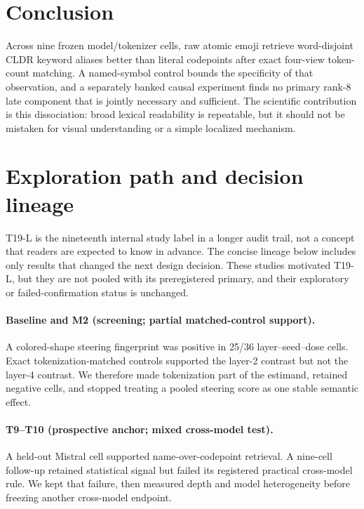 \documentclass{article}
\begin{document}
\section{Conclusion}

Across nine frozen model/tokenizer cells, raw atomic emoji retrieve
word-disjoint CLDR keyword aliases better than literal codepoints after exact
four-view token-count matching. A named-symbol control bounds the specificity
of that observation, and a separately banked causal experiment finds no
primary rank-8 late component that is jointly necessary and sufficient. The
scientific contribution is this dissociation: broad lexical readability is
repeatable, but it should not be mistaken for visual understanding or a simple
localized mechanism.




\clearpage
\appendix

\section{Exploration path and decision lineage}
\label{app:lineage}

T19-L is the nineteenth internal study label in a longer audit trail, not a
concept that readers are expected to know in advance. The concise lineage
below includes only results that changed the next design decision. These
studies motivated T19-L, but they are not pooled with its preregistered
primary, and their exploratory or failed-confirmation status is unchanged.

\paragraph{Baseline and M2 (screening; partial matched-control support).}
A colored-shape steering fingerprint was positive in 25/36
layer--seed--dose cells. Exact tokenization-matched controls supported the
layer-2 contrast but not the layer-4 contrast. We therefore made tokenization
part of the estimand, retained negative cells, and stopped treating a pooled
steering score as one stable semantic effect.

\paragraph{T9--T10 (prospective anchor; mixed cross-model test).}
A held-out Mistral cell supported name-over-codepoint retrieval. A nine-cell
follow-up retained statistical signal but failed its registered practical
cross-model rule. We kept that failure, then measured depth and model
heterogeneity before freezing another cross-model endpoint.
\end{document}

